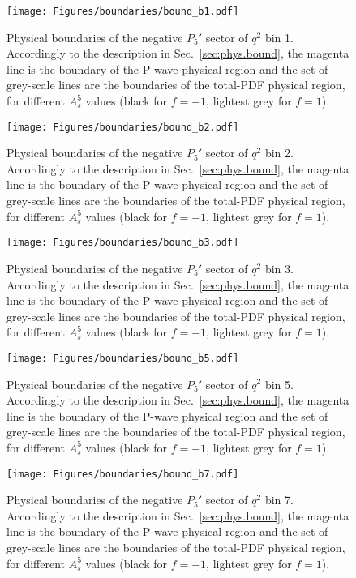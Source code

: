 \begin{figure}[!hbt]
  \centering
  \texttt{[image: Figures/boundaries/bound\_b1.pdf]}
  \caption{Physical boundaries of the negative $P_5'$ sector of $q^2$ bin 1. Accordingly to the description in Sec.~\ref{sec:phys.bound}, the magenta line is the boundary of the P-wave physical region and the set of grey-scale lines are the boundaries of the total-PDF physical region, for different $A_s^5$ values (black for $f=-1$, lightest grey for $f=1$).}
  \label{fig:bound1}
\end{figure}

\begin{figure}[!hbt]
  \centering
  \texttt{[image: Figures/boundaries/bound\_b2.pdf]}
  \caption{Physical boundaries of the negative $P_5'$ sector of $q^2$ bin 2. Accordingly to the description in Sec.~\ref{sec:phys.bound}, the magenta line is the boundary of the P-wave physical region and the set of grey-scale lines are the boundaries of the total-PDF physical region, for different $A_s^5$ values (black for $f=-1$, lightest grey for $f=1$).}
  \label{fig:bound2}
\end{figure}

\begin{figure}[!hbt]
  \centering
  \texttt{[image: Figures/boundaries/bound\_b3.pdf]}
  \caption{Physical boundaries of the negative $P_5'$ sector of $q^2$ bin 3. Accordingly to the description in Sec.~\ref{sec:phys.bound}, the magenta line is the boundary of the P-wave physical region and the set of grey-scale lines are the boundaries of the total-PDF physical region, for different $A_s^5$ values (black for $f=-1$, lightest grey for $f=1$).}
  \label{fig:bound3}
\end{figure}

\begin{figure}[!hbt]
  \centering
  \texttt{[image: Figures/boundaries/bound\_b5.pdf]}
  \caption{Physical boundaries of the negative $P_5'$ sector of $q^2$ bin 5. Accordingly to the description in Sec.~\ref{sec:phys.bound}, the magenta line is the boundary of the P-wave physical region and the set of grey-scale lines are the boundaries of the total-PDF physical region, for different $A_s^5$ values (black for $f=-1$, lightest grey for $f=1$).}
  \label{fig:bound5}
\end{figure}

\begin{figure}[!hbt]
  \centering
  \texttt{[image: Figures/boundaries/bound\_b7.pdf]}
  \caption{Physical boundaries of the negative $P_5'$ sector of $q^2$ bin 7. Accordingly to the description in Sec.~\ref{sec:phys.bound}, the magenta line is the boundary of the P-wave physical region and the set of grey-scale lines are the boundaries of the total-PDF physical region, for different $A_s^5$ values (black for $f=-1$, lightest grey for $f=1$).}
  \label{fig:bound7}
\end{figure}

